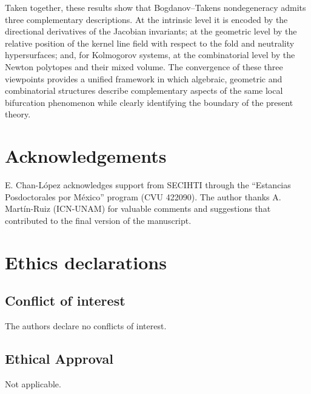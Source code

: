 \documentclass[12pt]{article}
\theoremstyle{plain}
\theoremstyle{definition}
\theoremstyle{remark}
\begin{document}
	Taken together, these results show that Bogdanov--Takens nondegeneracy admits
	three complementary descriptions. At the intrinsic level it is encoded by the
	directional derivatives of the Jacobian invariants; at the geometric level by
	the relative position of the kernel line field with respect to the fold and
	neutrality hypersurfaces; and, for Kolmogorov systems, at the combinatorial
	level by the Newton polytopes and their mixed volume. The convergence of these
	three viewpoints provides a unified framework in which algebraic, geometric and
	combinatorial structures describe complementary aspects of the same local
	bifurcation phenomenon while clearly identifying the boundary of the present
	theory.
	
	\section*{Acknowledgements}
	E. Chan-L\'opez acknowledges support from SECIHTI through the	``Estancias Posdoctorales por M\'exico'' program (CVU 422090). The author thanks A. Mart\'in-Ruiz (ICN-UNAM) for valuable comments
	and suggestions that contributed to the final version of the manuscript.
	
	\section*{Ethics declarations}
	\subsection*{Conflict of interest}
	The authors declare no conflicts of interest.
	
	\subsection*{Ethical Approval}
	Not applicable.
	
\end{document}
